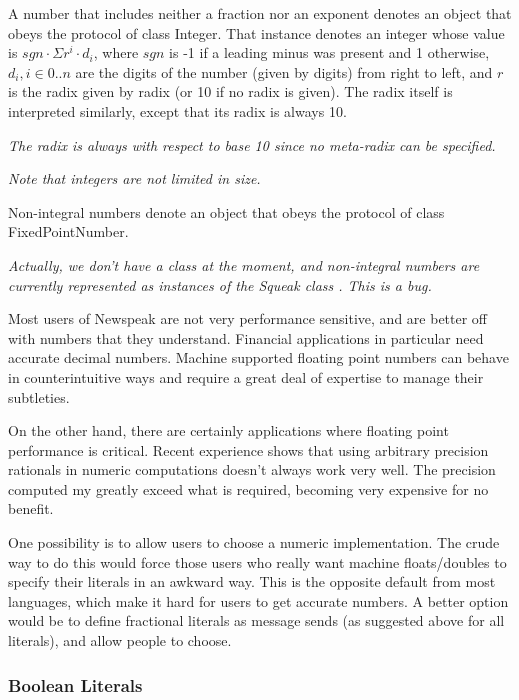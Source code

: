 \documentclass{article}
\newcommand{\code}[1]{{\sf #1}}
\begin{document}
A number that includes neither a fraction nor an exponent denotes an object that obeys the protocol of class \code{Integer}.
That instance denotes an integer whose value is  $sgn \cdot \Sigma r^i \cdot  d_i$, where $sgn$ is  -1 if a leading minus was present and 1 otherwise, $d_i, i \in 0 .. n$ are the digits of the number (given by \code{digits}) from right to left, and $r $ is the radix given by \code{radix} (or 10 if no radix is given). The radix itself is interpreted similarly, except that its radix is always 10.

{\it  The radix is always with respect to base 10 since no meta-radix can be specified.}

{\it  Note that integers are not limited in size.}

Non-integral numbers denote an object that obeys the protocol of class \code{FixedPointNumber}.


{\it Actually, we don't have a class  at the moment, and non-integral numbers are currently represented as instances of the Squeak class . This is a bug.

Most users of Newspeak are not very performance sensitive, and are better off with numbers that they understand. Financial applications in particular need accurate decimal numbers. Machine supported floating point numbers can behave in counterintuitive ways and require a great deal of expertise to manage their subtleties.

On the other hand, there are certainly applications where floating point performance is critical. 
Recent experience shows that using arbitrary precision rationals in numeric computations doesn't always work very well. The precision computed my greatly exceed what is required, becoming very expensive for no benefit.

One possibility is to
allow users to choose a numeric implementation.  The crude way to do this would force those users who really want machine floats/doubles to specify their literals in an awkward way. This is the opposite default from most languages, which make it hard for users to get accurate numbers. A better option would be to define fractional literals as message sends (as suggested above for all literals), and allow people to choose.
}

\subsubsection{Boolean Literals}
\label{bool}
\end{document}
